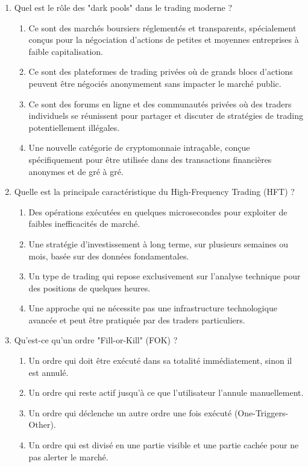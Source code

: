 \documentclass[a4paper,12pt]{article}
\begin{document}
\begin{enumerate}
    \item Quel est le rôle des "dark pools" dans le trading moderne ?
    \begin{enumerate}[label=(\Alph*)]
        \item Ce sont des marchés boursiers réglementés et transparents, spécialement conçus pour la négociation d'actions de petites et moyennes entreprises à faible capitalisation.
        \item Ce sont des plateformes de trading privées où de grands blocs d'actions peuvent être négociés anonymement sans impacter le marché public.
        \item Ce sont des forums en ligne et des communautés privées où des traders individuels se réunissent pour partager et discuter de stratégies de trading potentiellement illégales.
        \item Une nouvelle catégorie de cryptomonnaie intraçable, conçue spécifiquement pour être utilisée dans des transactions financières anonymes et de gré à gré.
    \end{enumerate}
    \item Quelle est la principale caractéristique du High-Frequency Trading (HFT) ?
    \begin{enumerate}[label=(\Alph*)]
        \item Des opérations exécutées en quelques microsecondes pour exploiter de faibles inefficacités de marché.
        \item Une stratégie d'investissement à long terme, sur plusieurs semaines ou mois, basée sur des données fondamentales.
        \item Un type de trading qui repose exclusivement sur l'analyse technique pour des positions de quelques heures.
        \item Une approche qui ne nécessite pas une infrastructure technologique avancée et peut être pratiquée par des traders particuliers.
    \end{enumerate}

    \item Qu'est-ce qu'un ordre "Fill-or-Kill" (FOK) ?
    \begin{enumerate}[label=(\Alph*)]
        \item Un ordre qui doit être exécuté dans sa totalité immédiatement, sinon il est annulé.
        \item Un ordre qui reste actif jusqu'à ce que l'utilisateur l'annule manuellement.
        \item Un ordre qui déclenche un autre ordre une fois exécuté (One-Triggers-Other).
        \item Un ordre qui est divisé en une partie visible et une partie cachée pour ne pas alerter le marché.
    \end{enumerate}


\end{enumerate}
\end{document}
